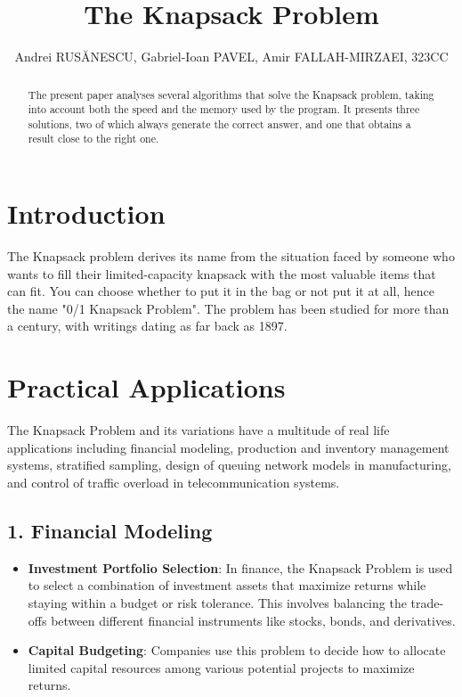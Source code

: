\documentclass{llncs}
\begin{document}
%
\title{The Knapsack Problem}
%
%
\author{Andrei RUSĂNESCU,
Gabriel-Ioan PAVEL,
Amir FALLAH-MIRZAEI,
323CC}
%
%
\maketitle              %
%
\begin{abstract}
The present paper analyses several algorithms that solve the Knapsack problem,
taking into account both the speed and the memory used by the program. It
presents three solutions, two of which always generate the correct answer, and
one that obtains a result close to the right one.

\end{abstract}
%
%
%
\section{Introduction}
The Knapsack problem derives its name from the situation faced by someone who wants
to fill their limited-capacity knapsack with the most valuable items that can fit.
You can choose whether to put it in the bag or not put it at all, hence the name
"0/1 Knapsack Problem". The problem has been studied for more than a century, with
writings dating as far back as 1897. 

\section{Practical Applications}
The Knapsack Problem and its variations have a multitude of real life applications
including financial modeling, production and inventory management systems, stratified
sampling, design of queuing network models in manufacturing, and control of traffic
overload in telecommunication systems.

\subsection*{1. Financial Modeling}
\begin{itemize}
    \item \textbf{Investment Portfolio Selection}: In finance, the Knapsack Problem
	is used to select a combination of investment assets that maximize returns while
	staying within a budget or risk tolerance. This involves balancing the trade-offs
	between different financial instruments like stocks, bonds, and derivatives.
    \item \textbf{Capital Budgeting}: Companies use this problem to decide how to
	allocate limited capital resources among various potential projects to maximize returns.
\end{itemize}
\end{document}

